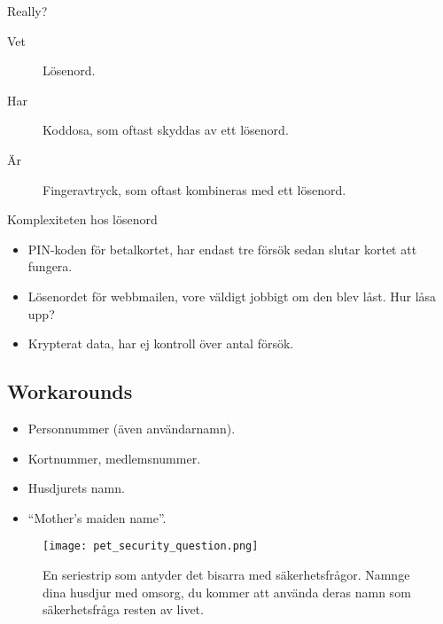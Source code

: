 \begin{frame}
  \begin{block}{Really?}
    \begin{description}
      \item[Vet] Lösenord.
      \item[Har] Koddosa, som oftast skyddas av ett lösenord.
      \item[Är] Fingeravtryck, som oftast kombineras med ett lösenord.
    \end{description}
  \end{block}
\end{frame}

\begin{frame}{Komplexiteten hos lösenord}
  \begin{itemize}
    \item PIN-koden för betalkortet, har endast tre försök sedan slutar kortet 
      att fungera.

      \pause{}

    \item Lösenordet för webbmailen, vore väldigt jobbigt om den blev låst.
      Hur låsa upp?

      \pause{}

    \item Krypterat data, har ej kontroll över antal försök.

  \end{itemize}
\end{frame}

\subsection{Workarounds}

\begin{frame}
  \begin{example}
    \begin{itemize}
      \item Personnummer (även användarnamn).
      \item Kortnummer, medlemsnummer.
      \item Husdjurets namn.
      \item \enquote{Mother's maiden name}.
    \end{itemize}
  \end{example}
\end{frame}

\begin{frame}
  \begin{figure}
    \texttt{[image: pet\_security\_question.png]}
    \caption{En seriestrip som antyder det bisarra med säkerhetsfrågor.
    Namnge dina husdjur med omsorg, du kommer att använda deras namn som 
    säkerhetsfråga resten av livet.}
  \end{figure}
\end{frame}

